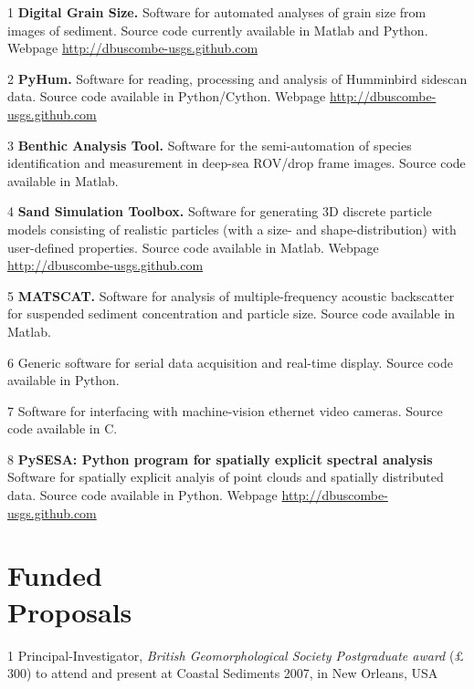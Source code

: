 \documentclass[margin,line]{resume}
\begin{document}
\begin{resume}
\begin{footnotesize}
\begin{list1}
	\item[1] {\bf Digital Grain Size.} Software for automated analyses of grain size from images of sediment. Source code currently available in Matlab and Python. Webpage \url{http://dbuscombe-usgs.github.com}\\
	\item[2] {\bf PyHum.} Software for reading, processing and analysis of Humminbird sidescan data. Source code available in Python/Cython. Webpage \url{http://dbuscombe-usgs.github.com}\\
	\item[3] {\bf Benthic Analysis Tool.} Software for the semi-automation of species identification and measurement in deep-sea ROV/drop frame images. Source code available in Matlab.\\
        \item[4] {\bf Sand Simulation Toolbox.} Software for generating 3D discrete particle models consisting of realistic particles (with a size- and shape-distribution) with user-defined properties. Source code available in Matlab. Webpage \url{http://dbuscombe-usgs.github.com}\\
        \item[5] {\bf MATSCAT.} Software for analysis of multiple-frequency acoustic backscatter for suspended sediment concentration and particle size. Source code available in Matlab.\\
      \item[6] Generic software for serial data acquisition and real-time display. Source code available in Python.\\
        \item[7] Software for interfacing with machine-vision ethernet video cameras. Source code available in C.\\
	\item[8] {\bf PySESA: Python program for spatially explicit spectral analysis } Software for spatially explicit analyis of point clouds and spatially distributed data. Source code available in Python. Webpage \url{http://dbuscombe-usgs.github.com}

	\end{list1}
        \end{footnotesize}

    \section{\mysidestyle Funded \\ Proposals}
        \begin{footnotesize}
	\begin{list1}
	\item[1] Principal-Investigator, {\sl British Geomorphological Society Postgraduate award} ($\pounds$300) to attend and present at Coastal Sediments 2007, in New Orleans, USA\\
	

\end{list1}
\end{footnotesize}
\end{resume}
\end{document}
